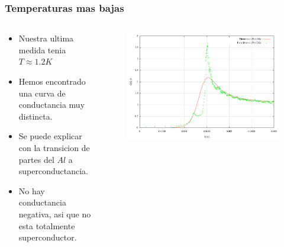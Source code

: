 \frame
{
  \frametitle{Temperaturas mas bajas}
    \begin{columns}
\begin{column}{0.6\textwidth}
     \begin{itemize}
      \item<1-> Nuestra ultima medida tenia $T\approx 1.2K$
      \item<2-> Hemos encontrado una curva de conductancia muy distincta.
      \item<3-> Se puede explicar con la transicion de partes del $Al$ a superconductancia.
      \item<4-> No hay conductancia negativa, asi que no esta totalmente superconductor.
     \end{itemize}
     
       \end{column}
\begin{column}{0.4\textwidth}
	\begin{figure}[!h] \label{sample}
	\includegraphics[width=\textwidth]{gv_theo_exp_10}
	\end{figure}
\end{column}
\end{columns} 

 }